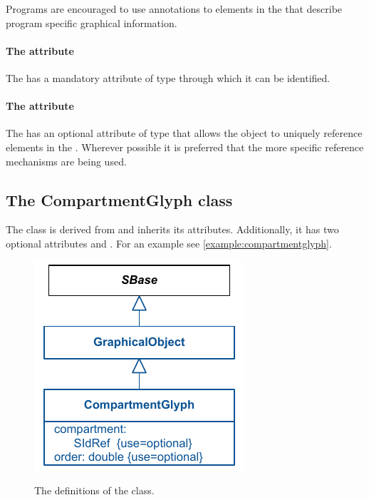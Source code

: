 Programs are encouraged to use annotations to \GraphicalObject elements 
in the  that describe program 
specific graphical information. 

\paragraph{The  attribute}
The \GraphicalObject has a mandatory  attribute of type 
 through which it can be identified. 


\paragraph{The  attribute}
The \GraphicalObject has an optional  attribute of type 
 that allows the object to uniquely reference elements 
in the \Model. Wherever possible it is preferred that the more specific 
reference mechanisms are being used. 


\subsection{The CompartmentGlyph class }
\label{compartmentglyph-class}
The \CompartmentGlyph class is derived from \GraphicalObject and 
inherits its attributes. Additionally, it has two optional attributes 
 and . For an example see 
\ref{example:compartmentglyph}. 



\begin{figure}[!h]
\includegraphics{uml/layout-compartmentglyph-uml}\\
\label{uml:compartmentglyph}
\caption{The definitions of the \CompartmentGlyph class.}
\end{figure}


